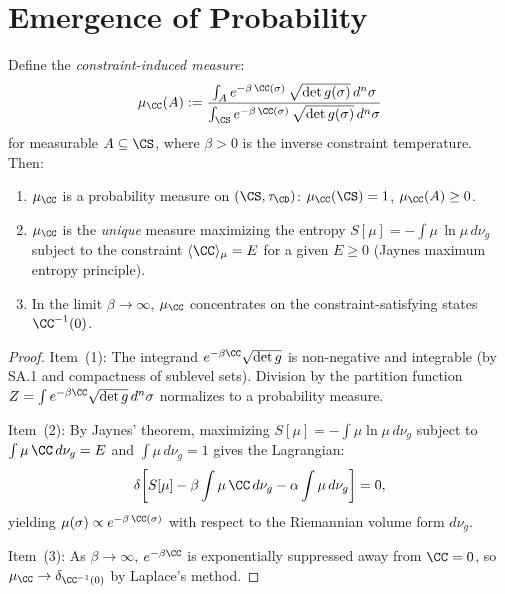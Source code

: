 \section{Emergence of Probability}
\label{sec:ch14:probability}

\begin{theorem}\label{thm:14.5}
Define the \emph{constraint-induced measure}:
\begin{equation}\label{eq:prob-measure}
  \mu_{\CC}(A) :=
  \frac{\int_A e^{-\beta\,\CC(\sigma)}\,
  \sqrt{\det g(\sigma)}\,d^n\sigma}
  {\int_{\CS} e^{-\beta\,\CC(\sigma)}\,
  \sqrt{\det g(\sigma)}\,d^n\sigma}
\end{equation}
for measurable $A \subseteq \CS$, where $\beta > 0$ is the inverse
constraint temperature.  Then:
\begin{enumerate}
  \item $\mu_{\CC}$ is a probability measure on $(\CS, \tau_{\CD})$:
        $\mu_{\CC}(\CS) = 1$, $\mu_{\CC}(A) \geq 0$.
  \item $\mu_{\CC}$ is the \emph{unique} measure maximizing the entropy
        $S[\mu] = -\int \mu\,\ln\mu\,d\nu_g$ subject to the constraint
        $\langle \CC \rangle_\mu = E$ for a given $E \geq 0$
        (Jaynes maximum entropy principle).
  \item In the limit $\beta \to \infty$, $\mu_{\CC}$ concentrates on
        the constraint-satisfying states $\CC^{-1}(0)$.
\end{enumerate}
\end{theorem}

\begin{proof}
Item~(1): The integrand $e^{-\beta\CC}\sqrt{\det g}$ is non-negative
and integrable (by SA.1 and compactness of sublevel sets).  Division
by the partition function $Z = \int e^{-\beta\CC}\sqrt{\det g}\,d^n\sigma$
normalizes to a probability measure.

Item~(2): By Jaynes' theorem, maximizing
$S[\mu] = -\int \mu\ln\mu\,d\nu_g$ subject to $\int \mu\,\CC\,d\nu_g = E$
and $\int \mu\,d\nu_g = 1$ gives the Lagrangian:
\[
  \delta\!\left[S[\mu] - \beta\int \mu\,\CC\,d\nu_g
  - \alpha\int \mu\,d\nu_g\right] = 0,
\]
yielding $\mu(\sigma) \propto e^{-\beta\,\CC(\sigma)}$ with respect to
the Riemannian volume form $d\nu_g$.

Item~(3): As $\beta \to \infty$, $e^{-\beta\CC}$ is exponentially
suppressed away from $\CC = 0$, so $\mu_{\CC} \to \delta_{\CC^{-1}(0)}$
by Laplace's method.
\end{proof}

